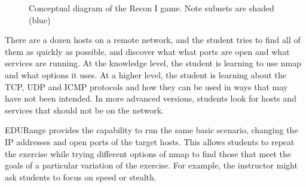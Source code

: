 \begin{figure}[h]
\hfill
\begin{center}

\caption{Conceptual diagram of the Recon I game. Note subnets are shaded (blue)}
\end{center}
\end{figure}

There are a dozen hosts on a remote network, and the student tries to find all of them as quickly as 
possible, and discover what what ports are open and what services are running.  At the knowledge level,
the student is learning to use nmap and what options it uses.  At a higher level, the student is learning
about the TCP, UDP and ICMP protocols and how they can be used in ways that may have not been intended.
In more advanced versions, students look for hosts and services that should not be on the network.

EDURange provides the capability to run the same basic scenario, changing the IP addresses and open ports
of the target hosts.  This allows students to repeat the exercise while trying different options of nmap to
find those that meet the goals of a particular variation of the exercise.  For example, the instructor
might ask students to focus on speed or stealth.

